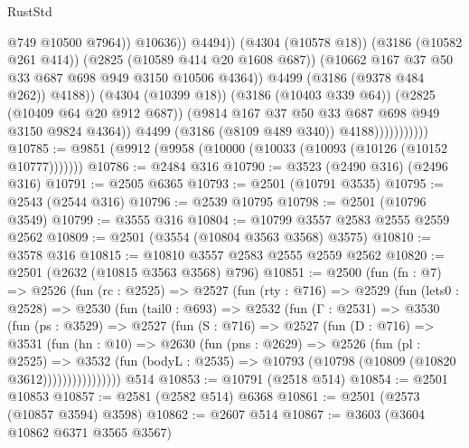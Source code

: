 \begin{lexlean}{RustStd}
\begin{coremodule}
{\begin{coremodule}
{{{{{{{{{{{{{{{{{{{{                                              @749
                                              @10500
                                              @7964))
                                          @10636))
                                      @4494))
                                  (@4304 (@10578 @18))
                                  (@3186 (@10582 @261 @414))
                                  (@2825 (@10589 @414 @20 @1608 @687))
                                  (@10662 @167 @37 @50 @33 @687 @698 @949 @3150 @10506 @4364))
                                @4499
                                (@3186 (@9378 @484 @262))
                                @4188))
                            (@4304 (@10399 @18))
                            (@3186 (@10403 @339 @64))
                            (@2825 (@10409 @64 @20 @912 @687))
                            (@9814 @167 @37 @50 @33 @687 @698 @949 @3150 @9824 @4364))
                          @4499
                          (@3186 (@8109 @489 @340))
                          @4188)))))))))))
@10785 := @9851 (@9912 (@9958 (@10000 (@10033 (@10093 (@10126 (@10152 @10777)))))))
@10786 := @2484 @316
@10790 := @3523 (@2490 @316) (@2496 @316)
@10791 := @2505 @6365
@10793 := @2501 (@10791 @3535)
@10795 := @2543 (@2544 @316)
@10796 := @2539 @10795
@10798 := @2501 (@10796 @3549)
@10799 := @3555 @316
@10804 := @10799 @3557 @2583 @2555 @2559 @2562
@10809 := @2501 (@3554 (@10804 @3563 @3568) @3575)
@10810 := @3578 @316
@10815 := @10810 @3557 @2583 @2555 @2559 @2562
@10820 := @2501 (@2632 (@10815 @3563 @3568) @796)
@10851 := @2500
    (fun (fn : @7) =>
    @2526
      (fun (rc : @2525) =>
      @2527
        (fun (rty : @716) =>
        @2529
          (fun (lets0 : @2528) =>
          @2530
            (fun (tail0 : @693) =>
            @2532
              (fun (Γ : @2531) =>
              @3530
                (fun (ps : @3529) =>
                @2527
                  (fun (S : @716) =>
                  @2527
                    (fun (D : @716) =>
                    @3531
                      (fun (hn : @10) =>
                      @2630
                        (fun (pns : @2629) =>
                        @2526
                          (fun (pl : @2525) =>
                          @3532
                            (fun (bodyL : @2535) =>
                            @10793 (@10798 (@10809 (@10820 @3612))))))))))))))))
    @514
@10853 := @10791 (@2518 @514)
@10854 := @2501 @10853
@10857 := @2581 (@2582 @514) @6368
@10861 := @2501 (@2573 (@10857 @3594) @3598)
@10862 := @2607 @514
@10867 := @3603 (@3604 @10862 @6371 @3565 @3567)
}}}}}}}}}}}}}}}}}}}}
\end{coremodule}}
\end{coremodule}
\end{lexlean}
